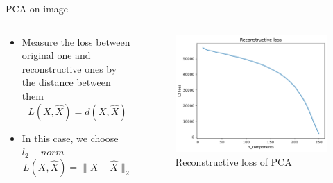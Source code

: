 \begin{frame}{PCA on image}
    \begin{columns}
        \begin{column}{0.5\textwidth}
            \begin{itemize}
                \item Measure the loss between original one and reconstructive ones by the distance between them
                $$L(X, \hat{X}) = d(X, \hat{X})$$
                \item In this case, we choose $l_2-norm$
                $$L(X, \hat{X}) = \|X-\hat{X}\|_2$$
            \end{itemize}
        \end{column}

        \begin{column}{0.5\textwidth}
            \begin{figure}
                \centering
                \includegraphics[width=\linewidth]{img/lena_compress_loss.pdf}
                \caption{Reconstructive loss of PCA}
            \end{figure}
        \end{column}
    \end{columns}
\end{frame}
